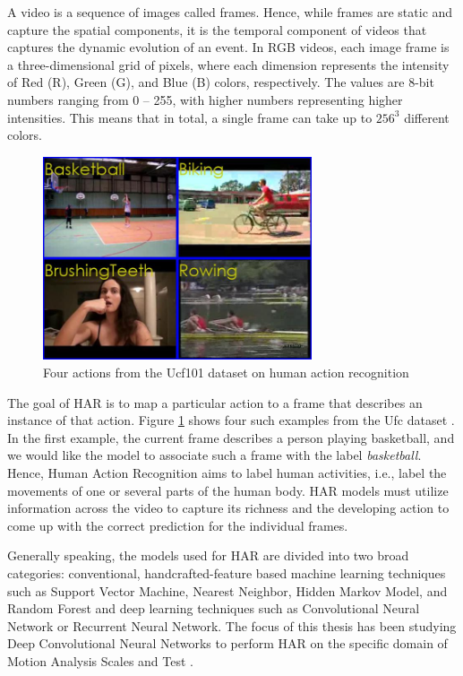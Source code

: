 \documentclass[extern,palatino]{cgMA}
\begin{document}
A video is a sequence of images called frames. Hence, while frames are static and capture the spatial components, it is the temporal component of videos that captures the dynamic evolution of an event. In RGB videos, each image frame is a three-dimensional grid of pixels, where each dimension represents the intensity of Red (R), Green (G), and Blue (B) colors, respectively. The values are 8-bit numbers ranging from 0 – 255, with higher numbers representing higher intensities. This means that in total, a single frame can take up to $256^{3}$ different colors. 

\begin{figure}[h]
\center
\includegraphics[height={170pt}]{images/ucf_actions.jpg}
\caption{Four actions from the Ucf101 dataset on human action recognition}
\label{ufc_actions}
\end{figure}

The goal of HAR is to map a particular action to a frame that describes an instance of that action. Figure \ref{ufc_actions} shows four such examples from the Ufc dataset \cite{soomro2012ucf101}. In the first example, the current frame describes a person playing basketball, and we would like the model to associate such a frame with the label \textit{basketball}. Hence, Human Action Recognition aims to label human activities, i.e., label the movements of one or several parts of the human body. HAR models must utilize information across the video to capture its richness and the developing action to come up with the correct prediction for the individual frames.

Generally speaking, the models used for HAR are divided into two broad categories: conventional, handcrafted-feature based machine learning techniques such as Support Vector Machine, Nearest Neighbor, Hidden Markov Model, and Random Forest \cite{pareek2021survey} and deep learning techniques such as Convolutional Neural Network or Recurrent Neural Network.
The focus of this thesis has been studying Deep Convolutional Neural Networks to perform HAR on the specific domain of Motion Analysis Scales and Test \cite{lausberg1997bewegungsdiagnosetest}.
\end{document}
